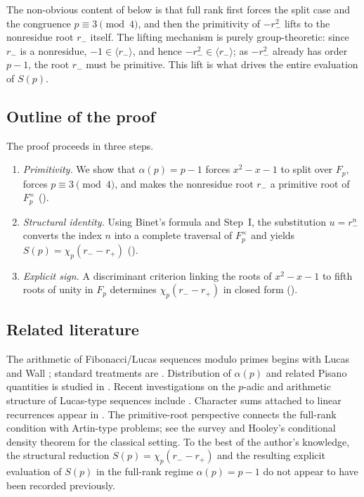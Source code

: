 \documentclass[preprint,5p,times,twocolumn]{elsarticle}
\def\F{F}\def\Z{Z}\def\Q{Q}\def\R{R}\def\N{N}%
\newcommand{\Z}{\mathbb{Z}}
\newcommand{\Q}{\mathbb{Q}}
\newcommand{\R}{\mathbb{R}}
\newcommand{\F}{\mathbb{F}}
\newcommand{\N}{\mathbb{N}}
\begin{document}
The non-obvious content of  below is that full rank 
first forces the split case and the congruence $p\equiv3\pmod4$, 
and then the primitivity of $-r_-^2$ lifts to the nonresidue root 
$r_-$ itself. The lifting mechanism is purely group-theoretic: 
since $r_-$ is a nonresidue, $-1\in\langle r_-\rangle$, and hence 
$-r_-^2\in\langle r_-\rangle$; as $-r_-^2$ already has order 
$p-1$, the root $r_-$ must be primitive. This lift is what drives 
the entire evaluation of $S(p)$.

\subsection{Outline of the proof}

The proof proceeds in three steps.
\begin{enumerate}[label=\textup{Step \Roman*.}, leftmargin=*]
\item \emph{Primitivity.}
We show that $\alpha(p)=p-1$ forces $x^2-x-1$ to split over 
$\F_p$, forces $p\equiv 3\pmod 4$, and makes the nonresidue root 
$r_-$ a primitive root of $\F_p^\times$ ().
\item \emph{Structural identity.}
Using Binet's formula and Step~I, the substitution $u=r_-^n$ 
converts the index $n$ into a complete traversal of $\F_p^\times$ 
and yields $S(p)=\chi_p(r_- - r_+)$ ().
\item \emph{Explicit sign.}
A discriminant criterion linking the roots of $x^2-x-1$ to fifth 
roots of unity in $\F_p$ determines $\chi_p(r_- - r_+)$ in 
closed form ().
\end{enumerate}

\subsection{Related literature}

The arithmetic of Fibonacci/Lucas sequences modulo primes begins 
with Lucas \cite{Lucas1878} and Wall \cite{Wall1960}; standard 
treatments are \cite{Vajda1989,Koshy2001,Lemmermeyer2000,
IrelandRosen1990}. Distribution of $\alpha(p)$ and related 
Pisano quantities is studied in \cite{Renault1996,BallotElia2007,
SomerKrizek2014,FiebigMbirikaSpilker2025}. Recent investigations 
on the $p$-adic and arithmetic structure of Lucas-type sequences 
include \cite{BragmanRowland2025,HajduTijdeman2025}. Character 
sums attached to linear recurrences appear in 
\cite{Williams1982,Sun1992,Sun2003,BerndtEvansWilliams1998}. 
The primitive-root perspective connects the full-rank condition 
with Artin-type problems; see the survey \cite{Moree2012} and 
Hooley's conditional density theorem \cite{Hooley1967} for the 
classical setting. To the best of the author's knowledge, the structural reduction
\(S(p)=\chi_p(r_- - r_+)\) and the resulting explicit evaluation
of \(S(p)\) in the full-rank regime \(\alpha(p)=p-1\) do not appear
to have been recorded previously.
\end{document}
